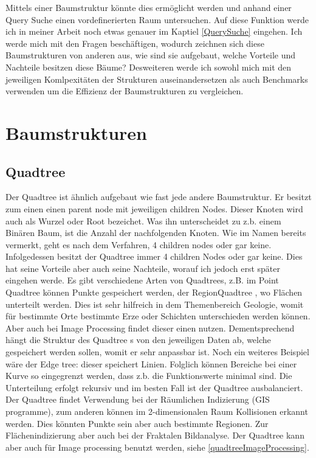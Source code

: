 \documentclass[11pt]{article}
\newcommand{\qt}{Quadtree }
\newcommand{\fett}[1]{{\bf #1}}
\begin{document}
Mittels einer Baumstruktur könnte dies ermöglicht werden und anhand einer Query Suche einen vordefinerierten Raum untersuchen. Auf diese Funktion werde ich in meiner Arbeit noch etwas genauer im Kaptiel \ref{QuerySuche} eingehen.\newline
Ich werde mich mit den Fragen beschäftigen, wodurch zeichnen sich diese Baumstrukturen von anderen aus, wie sind sie aufgebaut, welche Vorteile und Nachteile besitzen diese Bäume? 
Desweiteren werde ich sowohl mich mit den jeweiligen Komlpexitäten der Strukturen auseinandersetzen als auch Benchmarks verwenden um die Effizienz der Baumstrukturen zu vergleichen.  

\pagebreak
\section{Baumstrukturen} \label{TreeStructures}

\subsection{\fett{\qt}} \label{Quadtree}

Der \qt ist ähnlich aufgebaut wie fast jede andere Baumstruktur. Er besitzt zum einen einen parent node mit jeweiligen children Nodes.
Dieser Knoten wird auch als Wurzel oder Root bezeichet. Was ihn unterscheidet zu z.b. einem Binären Baum, ist die Anzahl der nachfolgenden Knoten.
Wie im Namen bereits vermerkt, geht es nach dem Verfahren, 4 children nodes oder gar keine. Infolgedessen besitzt der \qt immer 4 children Nodes oder gar keine. Dies hat seine Vorteile aber auch seine Nachteile, worauf ich jedoch erst später eingehen werde. 
\newline
Es gibt verschiedene Arten von Quadtrees, z.B. im Point Quadtree können Punkte gespeichert werden, der Region\qt , wo Flächen unterteilt werden. Dies ist sehr hilfreich in dem Themenbereich Geologie, womit für bestimmte Orte bestimmte Erze oder Schichten unterschieden werden können.
Aber auch bei Image Processing findet dieser einen nutzen. Dementsprechend hängt die Struktur des \qt s von den jeweiligen Daten ab, welche gespeichert werden sollen, womit er sehr anpassbar ist.   
Noch ein weiteres Beispiel wäre der Edge tree: dieser speichert Linien. Folglich können Bereiche bei einer Kurve so eingegrenzt werden, dass z.b. die Funktionswerte minimal sind.  
\newline
Die Unterteilung erfolgt rekursiv und im besten Fall ist der \qt ausbalanciert. 
\newline
Der \qt findet Verwendung bei der Räumlichen Indizierung (GIS programme), zum anderen können im 2-dimensionalen Raum Kollisionen erkannt werden. Dies könnten Punkte sein aber auch bestimmte Regionen. Zur Flächenindizierung aber auch bei der Fraktalen Bildanalyse. 
\newline
Der \qt kann aber auch für Image processing benutzt werden, siehe \ref{quadtreeImageProcessing}. 
\end{document}
